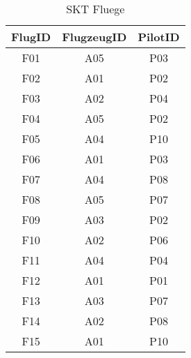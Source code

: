 \begin{table}[htbp]
\centering
\begin{tabular}{|c|c|c|}
\hline
\bfseries FlugID&\bfseries FlugzeugID&\bfseries PilotID\\
\hline
F01&A05&P03\\
\hline
F02&A01&P02\\
\hline
F03&A02&P04\\
\hline
F04&A05&P02\\
\hline
F05&A04&P10\\
\hline
F06&A01&P03\\
\hline
F07&A04&P08\\
\hline
F08&A05&P07\\
\hline
F09&A03&P02\\
\hline
F10&A02&P06\\
\hline
F11&A04&P04\\
\hline
F12&A01&P01\\
\hline
F13&A03&P07\\
\hline
F14&A02&P08\\
\hline
F15&A01&P10\\
\hline
\end{tabular}
\caption{SKT Fluege}
\label{tab:SKTFluege}
\end{table}
